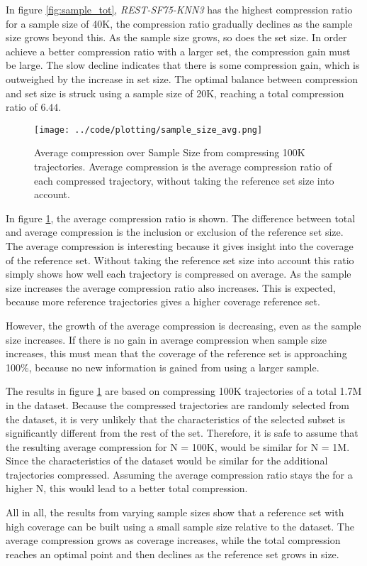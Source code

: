 In figure \ref{fig:sample_tot}, \textit{REST-SF75-KNN3} has the highest compression ratio for a sample size of 40K, the compression ratio gradually declines as the sample size grows beyond this. As the sample size grows, so does the set size. In order achieve a better compression ratio with a larger set, the compression gain must be large. The slow decline indicates that there is some compression gain, which is outweighed by the increase in set size. The optimal balance between compression and set size is struck using a sample size of 20K, reaching a total compression ratio of $6.44$.

\begin{figure}[h]
    \begin{minipage}{0.99\linewidth}
        \centering
        \texttt{[image: ../code/plotting/sample\_size\_avg.png]}
        \caption{Average compression over Sample Size from compressing 100K trajectories. Average compression is the average compression ratio of each compressed trajectory, without taking the reference set size into account.}
        \label{fig:sample_avg}
    \end{minipage}
\end{figure}

In figure \ref{fig:sample_avg}, the average compression ratio is shown. The difference between total and average compression is the inclusion or exclusion of the reference set size. The average compression is interesting because it gives insight into the coverage of the reference set. Without taking the reference set size into account this ratio simply shows how well each trajectory is compressed on average. As the sample size increases the average compression ratio also increases. This is expected, because more reference trajectories gives a higher coverage reference set.

However, the growth of the average compression is decreasing, even as the sample size increases. If there is no gain in average compression when sample size increases, this must mean that the coverage of the reference set is approaching 100\%, because no new information is gained from using a larger sample.

The results in figure \ref{fig:sample_avg} are based on compressing 100K trajectories of a total 1.7M in the dataset. Because the compressed trajectories are randomly selected from the dataset, it is very unlikely that the characteristics of the selected subset is significantly different from the rest of the set. Therefore, it is safe to assume that the resulting average compression for N = 100K, would be similar for N = 1M. Since the characteristics of the dataset would be similar for the additional trajectories compressed. Assuming the average compression ratio stays the for a higher N, this would lead to a better total compression.

All in all, the results from varying sample sizes show that a reference set with high coverage can be built using a small sample size relative to the dataset. The average compression grows as coverage increases, while the total compression reaches an optimal point and then declines as the reference set grows in size.